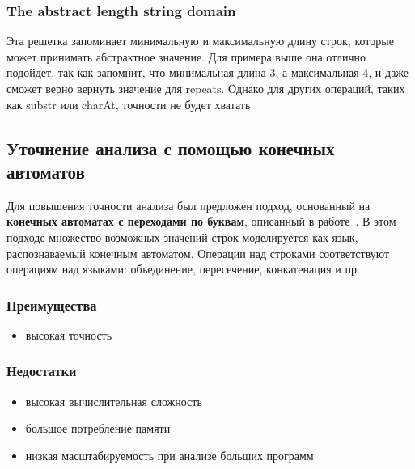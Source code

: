 \subsubsection*{The abstract length string domain}
Эта решетка запоминает минимальную и максимальную длину строк, которые может принимать абстрактное значение. Для примера выше она отлично подойдет, так как запомнит, что минимальная длина 3, а максимальная 4, и даже сможет верно вернуть значение для repeats. Однако для других операций, таких как substr или charAt, точности не будет хватать



\newpage
\subsection{Уточнение анализа с помощью конечных автоматов}

Для повышения точности анализа был предложен подход, основанный на \textbf{конечных автоматах с переходами по буквам}, описанный в работе~\cite{apinis2020symbolic}. В этом подходе множество возможных значений строк моделируется как язык, распознаваемый конечным автоматом. Операции над строками соответствуют операциям над языками: объединение, пересечение, конкатенация и пр.

\subsubsection*{Преимущества}
\begin{itemize}
    \item высокая точность
\end{itemize}

\subsubsection*{Недостатки}
\begin{itemize}
    \item высокая вычислительная сложность
    \item большое потребление памяти
    \item низкая масштабируемость при анализе больших программ
\end{itemize}

